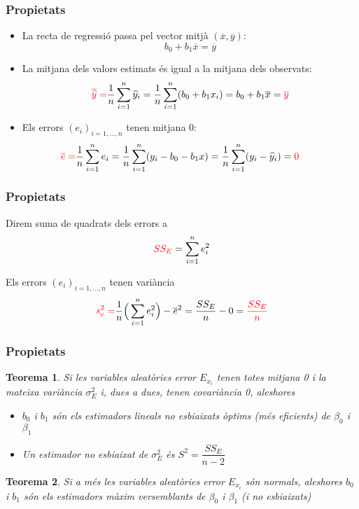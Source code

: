 \documentclass[12pt,t]{beamer}
\newcommand{\red}[1]{\textcolor{red}{#1}}
\renewcommand{\emph}[1]{{\color{red}#1}}
\theoremstyle{plain}
\newtheorem{teorema}{Teorema}
\theoremstyle{definition}
\begin{document}
\begin{frame}
\frametitle{Propietats}

\begin{itemize}
\item La recta de regressió passa pel vector mitjà
$(\overline{x},\overline{y})$:
$$
b_0+b_1 \overline{x}=\overline{y}
$$

\item La mitjana dels valors estimats és igual a la mitjana dels
observats:
$$
\red{\overline{\widehat{y}}=}\frac{1}{n}\sum_{i=1}^n\widehat{y}_i
=\frac{1}{n}\sum_{i=1}^n(b_0+b_1x_i)=
b_0+b_1 \overline{x}=\red{\overline{y}}
$$

\item Els errors $(e_i)_{i=1,\ldots,n}$ tenen mitjana 0:
$$
\hspace*{-0.7cm}\red{\overline{e}
=}\frac{1}{n}\sum_{i=1}^n e_i
=\frac{1}{n}\sum_{i=1}^n (y_i-b_0-b_1x)
=\frac{1}{n}\sum_{i=1}^n (y_i-\widehat{y}_i)
=\red{0}
$$
\end{itemize}
\end{frame}



\begin{frame}
\frametitle{Propietats}
Direm \emph{suma de quadrats dels errors} a
$$
\red{SS_E}=\sum_{i=1}^{n} e^2_i
$$
\medskip

Els errors $(e_i)_{i=1,\ldots,n}$ tenen variància
$$
\red{s_e^2=}\frac{1}{n}\Big(\sum_{i=1}^{n}
e^2_i\Big)-\overline{e}^2=\frac{SS_E}{n}-0=\red{\frac{SS_E}{n}}
$$

\end{frame}


\begin{frame}
\frametitle{Propietats}
\vspace*{-2ex}

\begin{teorema}
Si les variables aleatòries error $E_{x_i}$ tenen totes mitjana 0 i la mateixa variància $\sigma^2_E$ i, dues a dues, tenen covariància 0, aleshores

\begin{itemize}
\item $b_0$ i $b_1$ són els estimadors lineals no esbiaixats òptims (més eficients) de $\beta_0$ i $\beta_1$


\item Un estimador no esbiaixat de $\sigma_E^2$ és
$S^2=\dfrac{SS_E}{n-2}$
\end{itemize}
\end{teorema}

\begin{teorema}
Si \emph{a més} les variables aleatòries error $E_{x_i}$ són normals, aleshores
 $b_0$ i $b_1$ són els estimadors màxim versemblants de $\beta_0$ i $\beta_1$ (i no esbiaixats)
 \end{teorema}
\end{frame}
\end{document}
